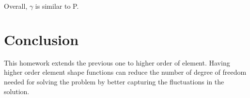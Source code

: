 \documentclass[paper=a4, fontsize=11pt]{article} %
\begin{document}
Overall, $\gamma$ is similar  to P. 





\section{Conclusion}

This homework extends the previous one to higher order of element. Having higher order element shape functions can reduce the number of degree of freedom needed for solving the problem by better capturing the fluctuations in the solution. 
\end{document}
